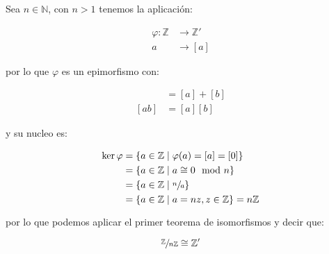         \begin{ejemplo}
            Sea $n \in \mathbb{N}$, con $n > 1$ tenemos la aplicación:

            \begin{align*}
                \varphi \colon \mathbb{Z} &\to \mathbb{Z}' \\
                 a &\to [a]
            \end{align*}

            por lo que $\varphi$ es un epimorfismo con:

            \begin{align*}
                [a + b] &= [a] + [b] \\[0cm]
                [ab] &= [a] [b]
            \end{align*}

            y su nucleo es:

            \begin{align*}
                \ker{\varphi} &= \left\{ a \in \mathbb{Z} \mid \varphi(a) = [a] = [0] \right\} \\
                &= \left\{ a \in \mathbb{Z} \mid a \cong 0 \mod{n} \right\} \\
                &= \left\{ a \in \mathbb{Z} \mid \sfrac{n}{a} \right\} \\
                &= \left\{ a \in \mathbb{Z} \mid a = n z, z \in \mathbb{Z} \right\} = n \mathbb{Z}
            \end{align*}

            por lo que podemos aplicar el primer teorema de isomorfismos y decir que:

            \begin{equation*}
                \sfrac{\mathbb{Z}}{n \mathbb{Z}} \cong \mathbb{Z}'
            \end{equation*}
        \end{ejemplo}

